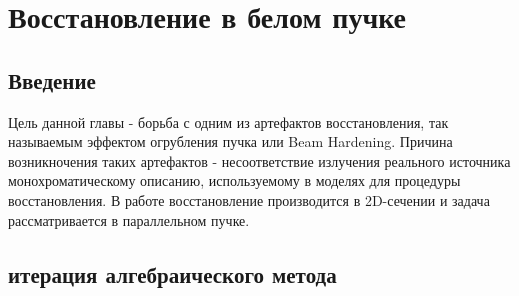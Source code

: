 \chapter{Восстановление в белом пучке} \label{chapt3}
\section{Введение}

Цель данной главы - борьба с одним из артефактов восстановления, так называемым эффектом огрубления пучка или Beam Hardening. 
Причина возникночения таких артефактов - несоответствие излучения реального источника монохроматическому описанию, используемому в моделях для процедуры восстановления. 
В работе восстановление производится в 2D-сечении и задача рассматривается в параллельном пучке.

\section{итерация алгебраического метода} \label{sect3_1}


